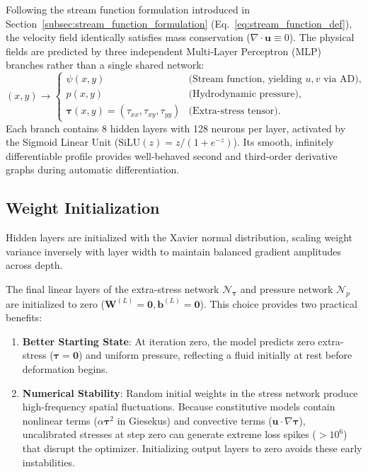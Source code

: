 Following the stream function formulation introduced in Section~\ref{subsec:stream_function_formulation}
(Eq.~\eqref{eq:stream_function_def}), the velocity field identically satisfies
mass conservation ($\nabla \cdot \boldsymbol{u} \equiv 0$).
The physical fields are predicted by three independent Multi-Layer Perceptron (MLP) branches rather
than a single shared network:
\begin{equation}
    (x, y) \longrightarrow 
    \begin{cases}
        \psi(x, y)  & \text{(Stream function, yielding } u, v\text{ via AD)}, \\
        p(x, y) & \text{(Hydrodynamic pressure)}, \\
        \boldsymbol{\tau}(x, y) = (\tau_{xx}, \tau_{xy}, \tau_{yy}) & \text{(Extra-stress tensor)} .
    \end{cases}
    \label{eq:three_heads_mapping}
\end{equation}
Each branch contains 8 hidden layers with 128 neurons per layer, activated by
the Sigmoid Linear Unit ($\mathrm{SiLU}(z) = z / (1 + e^{-z})$). Its smooth,
infinitely differentiable profile provides well-behaved second and third-order
derivative graphs during automatic differentiation.

\subsection{Weight Initialization}
\label{subsec:physics_informed_initialization}

Hidden layers are initialized with the Xavier normal distribution, scaling
weight variance inversely with layer width to maintain balanced gradient
amplitudes across depth.

The final linear layers of the extra-stress network $\mathcal{N}_{\boldsymbol{\tau}}$
and pressure network $\mathcal{N}_p$ are initialized to zero
($\boldsymbol{W}^{(L)} = \boldsymbol{0}, \boldsymbol{b}^{(L)} = \boldsymbol{0}$).
This choice provides two practical benefits:
\begin{enumerate}
    \item \textbf{Better Starting State}:
        At iteration zero, the model predicts zero extra-stress
        ($\boldsymbol{\tau} = \boldsymbol{0}$) and uniform pressure, reflecting
        a fluid initially at rest before deformation begins.
    \item \textbf{Numerical Stability}:
        Random initial weights in the stress network produce high-frequency
        spatial fluctuations. Because constitutive models contain nonlinear
        terms ($\alpha \boldsymbol{\tau}^2$ in Giesekus) and convective terms
        ($\boldsymbol{u} \cdot \nabla \boldsymbol{\tau}$), uncalibrated stresses
        at step zero can generate extreme loss spikes ($> 10^6$) that disrupt
        the optimizer. Initializing output layers to zero avoids these early
        instabilities.
\end{enumerate}

